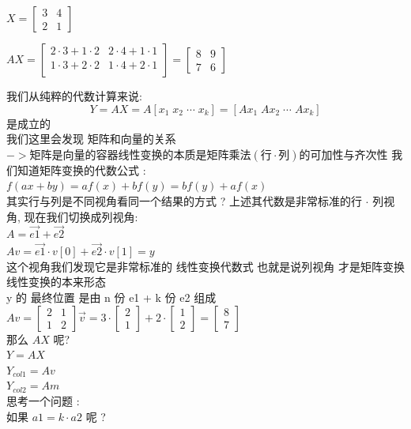\documentclass[12pt]{article}
\begin{document}
$ X  = \begin{bmatrix}
        3 & 4 \\
        2 & 1
    \end{bmatrix}$

$ AX  = \begin{bmatrix}
        2 \cdot 3 + 1 \cdot 2 & 2 \cdot 4 + 1 \cdot 1 \\
        1 \cdot 3 + 2 \cdot 2 & 1 \cdot 4 + 2 \cdot 1 \\
    \end{bmatrix} = \begin{bmatrix}
        8 & 9 \\
        7 & 6
    \end{bmatrix}$



我们从纯粹的代数计算来说:
\[
    Y =  AX  =  A[x_{1} \;  x_{2} \;  \cdots \; x_{k}] = [Ax_{1} \; Ax_{2} \; \cdots \; Ax_{k}]
\]
是成立的 \\
我们这里会发现 矩阵和向量的关系 $-> 矩阵是向量的容器 线性变换的本质是 矩阵乘法(行 \cdot 列)的 可加性与齐次性$
我们知道矩阵变换的代数公式 :  \\
$ f(ax + by) = af(x) + bf(y) = bf(y) + af(x) $ \\
其实行与列是不同视角看同一个结果的方式 ?
上述其代数是非常标准的行 $\cdot$ 列视角, 现在我们切换成列视角: \\
$A = \vec{e1} + \vec{e2}$   \\
$Av = \vec{e1} \cdot v[0] + \vec{e2} \cdot v[1] = y$ \\
这个视角我们发现它是非常标准的 线性变换代数式 也就是说列视角 才是矩阵变换 线性变换的本来形态 \\
y 的 最终位置 是由 n 份 e1 + k 份 e2 组成 \\
$Av  = \begin{bmatrix}
        2 & 1 \\
        1 & 2
    \end{bmatrix}\vec{v} = 3 \cdot \begin{bmatrix}
        2 \\
        1
    \end{bmatrix} + 2 \cdot \begin{bmatrix}
        1 \\
        2
    \end{bmatrix} = \begin{bmatrix}
        8 \\
        7
    \end{bmatrix}$ \\
那么 $AX$ 呢?  \\
$Y = AX$ \\
$Y_{col1} = Av $ \\
$Y_{col2} = Am$ \\
思考一个问题 :\\
如果 $a1 = k \cdot a2$ 呢 ?
\end{document}
